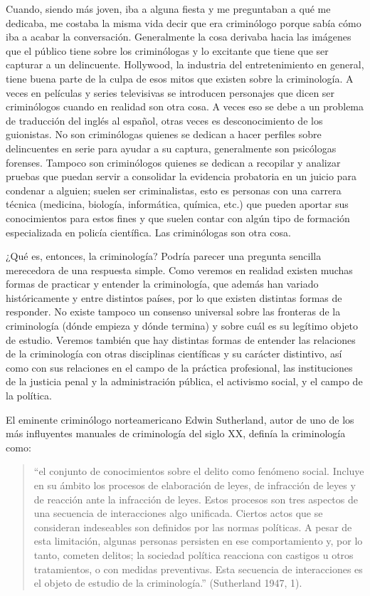 \documentclass[
  spanish,
  letterpaper,
  DIV=11,
  numbers=noendperiod]{scrreprt}
\begin{document}
Cuando, siendo más joven, iba a alguna fiesta y me preguntaban a qué me
dedicaba, me costaba la misma vida decir que era criminólogo porque
sabía cómo iba a acabar la conversación. Generalmente la cosa derivaba
hacia las imágenes que el público tiene sobre los criminólogas y lo
excitante que tiene que ser capturar a un delincuente. Hollywood, la
industria del entretenimiento en general, tiene buena parte de la culpa
de esos mitos que existen sobre la criminología. A veces en películas y
series televisivas se introducen personajes que dicen ser criminólogos
cuando en realidad son otra cosa. A veces eso se debe a un problema de
traducción del inglés al español, otras veces es desconocimiento de los
guionistas. No son criminólogas quienes se dedican a hacer perfiles
sobre delincuentes en serie para ayudar a su captura, generalmente son
psicólogas forenses. Tampoco son criminólogos quienes se dedican a
recopilar y analizar pruebas que puedan servir a consolidar la evidencia
probatoria en un juicio para condenar a alguien; suelen ser
criminalistas, esto es personas con una carrera técnica (medicina,
biología, informática, química, etc.) que pueden aportar sus
conocimientos para estos fines y que suelen contar con algún tipo de
formación especializada en policía científica. Las criminólogas son otra
cosa.

¿Qué es, entonces, la criminología? Podría parecer una pregunta sencilla
merecedora de una respuesta simple. Como veremos en realidad existen
muchas formas de practicar y entender la criminología, que además han
variado históricamente y entre distintos países, por lo que existen
distintas formas de responder. No existe tampoco un consenso universal
sobre las fronteras de la criminología (dónde empieza y dónde termina) y
sobre cuál es su legítimo objeto de estudio. Veremos también que hay
distintas formas de entender las relaciones de la criminología con otras
disciplinas científicas y su carácter distintivo, así como con sus
relaciones en el campo de la práctica profesional, las instituciones de
la justicia penal y la administración pública, el activismo social, y el
campo de la política.

El eminente criminólogo norteamericano Edwin Sutherland, autor de uno de
los más influyentes manuales de criminología del siglo XX, definía la
criminología como:

\begin{quote}
``el conjunto de conocimientos sobre el delito como fenómeno social.
Incluye en su ámbito los procesos de elaboración de leyes, de infracción
de leyes y de reacción ante la infracción de leyes. Estos procesos son
tres aspectos de una secuencia de interacciones algo unificada. Ciertos
actos que se consideran indeseables son definidos por las normas
políticas. A pesar de esta limitación, algunas personas persisten en ese
comportamiento y, por lo tanto, cometen delitos; la sociedad política
reacciona con castigos u otros tratamientos, o con medidas preventivas.
Esta secuencia de interacciones es el objeto de estudio de la
criminología.'' (Sutherland 1947, 1).
\end{quote}
\end{document}
